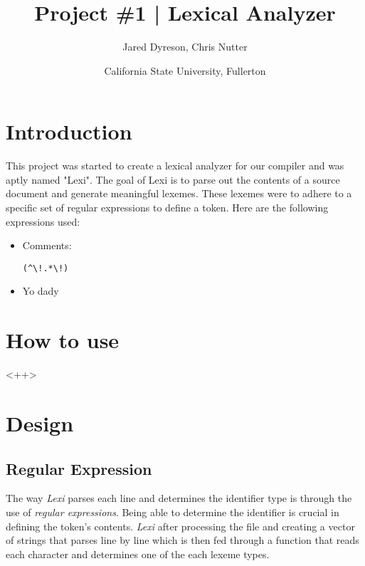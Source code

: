 \documentclass{article}
\title{Project \#1 | Lexical Analyzer}
\author{Jared Dyreson, Chris Nutter}
\date{California State University, Fullerton}
\begin{document}
\maketitle
\tableofcontents
\newpage

\section{Introduction}
This project was started to create a lexical analyzer for our compiler and was aptly named "Lexi".
The goal of Lexi is to parse out the contents of a source document and generate meaningful  lexemes.
These lexemes were to adhere to a specific set of regular expressions to define a token.
Here are the following expressions used:
\begin{itemize}
\item Comments: \begin{Verbatim}[frame=single]
    (^\!.*\!)
\end{Verbatim}
\item Yo dady
\end{itemize}
\newpage
\section{How to use}
<++>
\section{Design}
\subsection{Regular Expression}
    The way \emph{Lexi} parses each line and determines the identifier type is through the use of \emph{regular expressions}. Being able to determine the identifier is crucial in defining the token's contents. \emph{Lexi} after processing the file and creating a vector of strings that parses line by line which is then fed through a function that reads each character and determines one of the each lexeme types.
\end{document}
